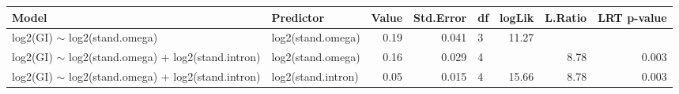 \begin{table}[ht]
\centering
\begin{tabular}{llrrlrrr}
  \hline
Model & Predictor & Value & Std.Error & df & logLik & L.Ratio & LRT p-value \\ 
  \hline
log2(GI) $\sim$ log2(stand.omega) & log2(stand.omega) & 0.19 & 0.041 & 3 & 11.27 &  &  \\ 
  log2(GI) $\sim$ log2(stand.omega) + log2(stand.intron) & log2(stand.omega) & 0.16 & 0.029 & 4 &  & 8.78 & 0.003 \\ 
  log2(GI) $\sim$ log2(stand.omega) + log2(stand.intron) & log2(stand.intron) & 0.05 & 0.015 & 4 & 15.66 & 8.78 & 0.003 \\ 
   \hline
\end{tabular}
\end{table}
